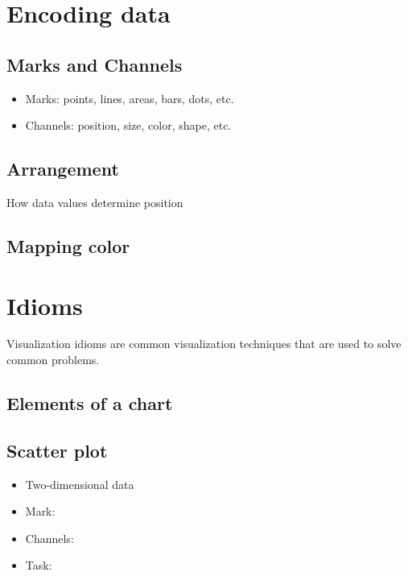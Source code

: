 \section{Encoding data}

\subsection{Marks and Channels}
\begin{itemize}
    \item Marks: points, lines, areas, bars, dots, etc.
    \item Channels: position, size, color, shape, etc.
\end{itemize}

\subsection{Arrangement}
How data values determine position

\subsection{Mapping color}

\section{Idioms}
Visualization idioms are common visualization techniques that are used to solve common problems.

\subsection{Elements of a chart}

\subsection{Scatter plot}
\begin{definition}
    
    \begin{itemize}
        \item Two-dimensional data
        \item Mark:
        \item Channels:
        \item Task:
    \end{itemize}
\end{definition}

